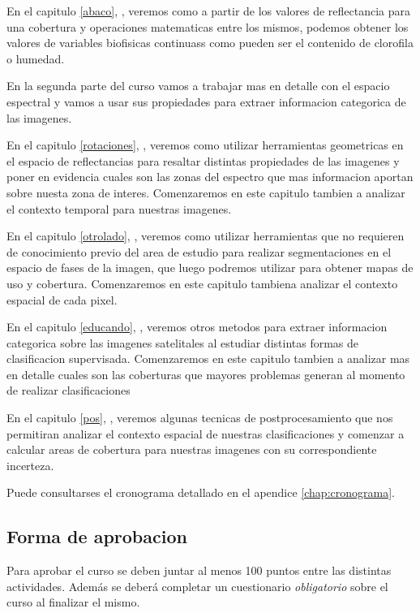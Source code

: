 En el capitulo \ref{abaco}, , veremos como a partir de los valores
de reflectancia para una cobertura y operaciones matematicas entre los mismos,
podemos obtener los valores de variables biofisicas continuass como pueden ser
el contenido de clorofila o humedad.

En la segunda parte del curso vamos a trabajar mas en detalle con el espacio
espectral y vamos a usar sus propiedades para extraer informacion categorica de
las imagenes.

En el capitulo \ref{rotaciones}, , veremos como utilizar
herramientas geometricas en el espacio de reflectancias para resaltar distintas
propiedades de las imagenes y poner en evidencia cuales son las zonas del espectro
que mas informacion aportan sobre nuesta zona de interes. Comenzaremos en este
capitulo tambien a analizar el contexto temporal para nuestras imagenes.

En el capitulo \ref{otrolado}, , veremos como utilizar herramientas
que no requieren de conocimiento previo del area de estudio para realizar segmentaciones
en el espacio de fases de la imagen, que luego podremos utilizar para obtener mapas
de uso y cobertura. Comenzaremos en este capitulo tambiena analizar el contexto
espacial de cada pixel.

En el capitulo \ref{educando}, , veremos otros metodos para extraer
informacion categorica sobre las imagenes satelitales al estudiar distintas
formas de clasificacion supervisada. Comenzaremos en este capitulo tambien a
analizar mas en detalle cuales son las coberturas que mayores problemas generan al
momento de realizar clasificaciones

En el capitulo \ref{pos}, , veremos algunas tecnicas de postprocesamiento
que nos permitiran analizar el contexto espacial de nuestras clasificaciones y
comenzar a calcular areas de cobertura para nuestras imagenes con su correspondiente incerteza.

Puede consultarses el cronograma detallado en el apendice \ref{chap:cronograma}.

\subsection{Forma de aprobacion}
Para aprobar el curso se deben juntar al menos 100 puntos entre las distintas actividades.
Adem\'as se deber\'a completar un cuestionario \emph{obligatorio} sobre el curso al finalizar el mismo.

